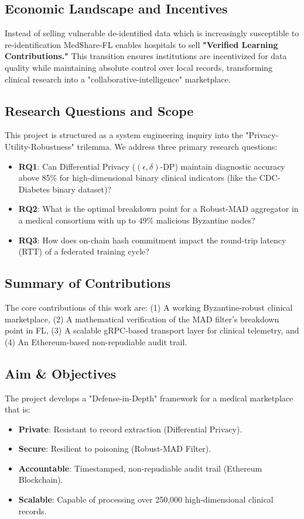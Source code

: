 \documentclass[10pt, a4paper, twocolumn]{article}
\begin{document}
\subsection{Economic Landscape and Incentives}
Instead of selling vulnerable de-identified data which is increasingly susceptible to re-identification MedShare-FL enables hospitals to sell \textbf{"Verified Learning Contributions."} This transition ensures institutions are incentivized for data quality while maintaining absolute control over local records, transforming clinical research into a "collaborative-intelligence" marketplace.

\subsection{Research Questions and Scope}
This project is structured as a system engineering inquiry into the "Privacy-Utility-Robustness" trilemma. We address three primary research questions:
\begin{itemize}
    \item \textbf{RQ1}: Can Differential Privacy ($(\epsilon, \delta)$-DP) maintain diagnostic accuracy above 85\% for high-dimensional binary clinical indicators (like the CDC-Diabetes binary dataset)?
    \item \textbf{RQ2}: What is the optimal breakdown point for a Robust-MAD aggregator in a medical consortium with up to 49\% malicious Byzantine nodes?
    \item \textbf{RQ3}: How does on-chain hash commitment impact the round-trip latency (RTT) of a federated training cycle?
\end{itemize}

\subsection{Summary of Contributions}
The core contributions of this work are: (1) A working Byzantine-robust clinical marketplace, (2) A mathematical verification of the MAD filter's breakdown point in FL, (3) A scalable gRPC-based transport layer for clinical telemetry, and (4) An Ethereum-based non-repudiable audit trail.

\subsection{Aim \& Objectives}
The project develops a "Defense-in-Depth" framework for a medical marketplace that is:
\begin{itemize}
    \item \textbf{Private}: Resistant to record extraction (Differential Privacy).
    \item \textbf{Secure}: Resilient to poisoning (Robust-MAD Filter).
    \item \textbf{Accountable}: Timestamped, non-repudiable audit trail (Ethereum Blockchain).
    \item \textbf{Scalable}: Capable of processing over 250,000 high-dimensional clinical records.
\end{itemize}
\end{document}
